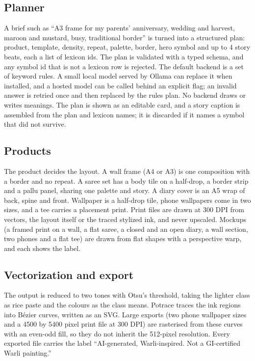 \documentclass[conference]{IEEEtran}
\begin{document}
\subsection{Planner}

A brief such as ``A3 frame for my parents' anniversary, wedding and harvest, maroon and mustard, busy, traditional border'' is turned into a structured plan: product, template, density, repeat, palette, border, hero symbol and up to 4 story beats, each a list of lexicon ids. The plan is validated with a typed schema, and any symbol id that is not a lexicon row is rejected. The default backend is a set of keyword rules. A small local model served by Ollama can replace it when installed, and a hosted model can be called behind an explicit flag; an invalid answer is retried once and then replaced by the rules plan. No backend draws or writes meanings. The plan is shown as an editable card, and a story caption is assembled from the plan and lexicon names; it is discarded if it names a symbol that did not survive.

\subsection{Products}

The product decides the layout. A wall frame (A4 or A3) is one composition with a border and no repeat. A saree set has a body tile on a half-drop, a border strip and a pallu panel, sharing one palette and story. A diary cover is an A5 wrap of back, spine and front. Wallpaper is a half-drop tile, phone wallpapers come in two sizes, and a tee carries a placement print. Print files are drawn at 300 DPI from vectors, the layout itself or the traced stylized ink, and never upscaled. Mockups (a framed print on a wall, a flat saree, a closed and an open diary, a wall section, two phones and a flat tee) are drawn from flat shapes with a perspective warp, and each shows the label.

\subsection{Vectorization and export}

The output is reduced to two tones with Otsu's threshold, taking the lighter class as rice paste and the colours as the class means. Potrace \cite{selinger2003potrace} traces the ink regions into B\'ezier curves, written as an SVG. Large exports (two phone wallpaper sizes and a 4500 by 5400 pixel print file at 300 DPI) are rasterised from these curves with an even-odd fill, so they do not inherit the 512-pixel resolution. Every exported file carries the label ``AI-generated, Warli-inspired. Not a GI-certified Warli painting.''
\end{document}
